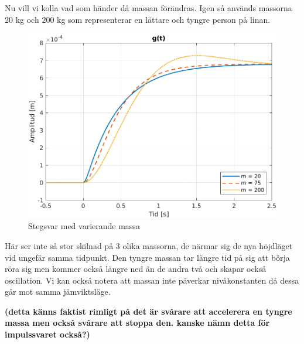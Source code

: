 \newpage
Nu vill vi kolla vad som händer då massan förändras. Igen så används massorna $20$ kg och $200$ kg som representerar en lättare och tyngre person på linan.
\begin{figure}[H]
    \centering
    \includegraphics[scale=0.9]{bilder/stegsvar_variation_m}
    \caption{Stegsvar med varierande massa}
    \label{fig:stegsvar_variation_m}
\end{figure}
Här ser inte så stor skilnad på 3 olika massorna, de närmar sig de nya höjdläget vid ungefär samma tidpunkt. Den tyngre massan tar längre tid på sig att börja röra sig men kommer också längre ned än de andra två och skapar också oscillation.
Vi kan också notera att massan inte påverkar nivåkonstanten då dessa går mot samma jämviktsläge.

\textbf{(detta känns faktist rimligt på det är svårare att accelerera en tyngre massa men också svårare att stoppa den. kanske nämn detta för impulssvaret också?)}

